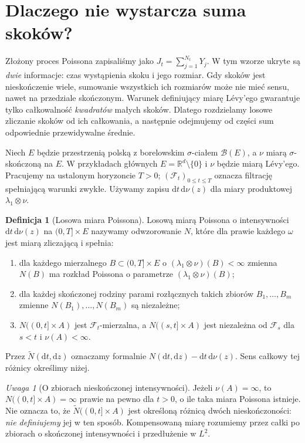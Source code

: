 \documentclass[11pt,a4paper,oneside]{report}
\numberwithin{equation}{chapter}
\theoremstyle{plain}
\theoremstyle{definition}
\newtheorem{definicja}{Definicja}[chapter]
\theoremstyle{remark}
\newtheorem{uwaga}{Uwaga}[chapter]
\newcommand{\R}{\mathbb{R}}
\newcommand{\calF}{\mathcal{F}}
\newcommand{\calB}{\mathcal{B}}
\newcommand{\dd}{\mathrm{d}}
\begin{document}
\section{Dlaczego nie wystarcza suma skoków?}

Złożony proces Poissona zapisaliśmy jako $J_t=\sum_{j=1}^{N_t}Y_j$.
W tym wzorze ukryte są \emph{dwie} informacje: czas wystąpienia
skoku i jego rozmiar. Gdy skoków jest nieskończenie wiele, sumowanie
wszystkich ich rozmiarów może nie mieć sensu, nawet na przedziale
skończonym. Warunek definiujący miarę Lévy'ego gwarantuje tylko
całkowalność \emph{kwadratów} małych skoków. Dlatego rozdzielamy
losowe zliczanie skoków od ich całkowania, a następnie odejmujemy
od części sum odpowiednie przewidywalne średnie.

Niech $E$ będzie przestrzenią polską z borelowskim $\sigma$-ciałem
$\calB(E)$, a $\nu$ miarą $\sigma$-skończoną na $E$.
W przykładach głównych $E=\R^d\setminus\{0\}$ i $\nu$ będzie
miarą Lévy'ego. Pracujemy na ustalonym horyzoncie $T>0$;
$(\calF_t)_{0\le t\le T}$ oznacza filtrację spełniającą warunki
zwykłe. Używamy zapisu $\dd t\,\dd\nu(z)$ dla miary
produktowej $\lambda_1\otimes\nu$.

\begin{definicja}[Losowa miara Poissona]
\label{def:PRM}
Losową miarą Poissona o intensywności $\dd t\,\dd\nu(z)$ na
$(0,T]\times E$ nazywamy odwzorowanie $N$, które dla prawie każdego
$\omega$ jest miarą zliczającą i spełnia:
\begin{enumerate}
\item dla każdego mierzalnego $B\subset(0,T]\times E$ o
$(\lambda_1\otimes\nu)(B)<\infty$ zmienna $N(B)$ ma rozkład
Poissona o parametrze $(\lambda_1\otimes\nu)(B)$;
\item dla każdej skończonej rodziny parami rozłącznych takich
zbiorów $B_1,\ldots,B_m$ zmienne $N(B_1),\ldots,N(B_m)$ są niezależne;
\item $N((0,t]\times A)$ jest $\calF_t$-mierzalna, a
$N((s,t]\times A)$ jest niezależna od $\calF_s$ dla $s<t$
i $\nu(A)<\infty$.
\end{enumerate}
Przez $\widetilde N(\dd t,\dd z)$ oznaczamy formalnie
$N(\dd t,\dd z)-\dd t\,\dd\nu(z)$. Sens całkowy tej różnicy
określimy niżej.
\end{definicja}

\begin{uwaga}[O zbiorach nieskończonej intensywności]
Jeżeli $\nu(A)=\infty$, to $N((0,t]\times A)=\infty$
prawie na pewno dla $t>0$, o ile taka miara Poissona istnieje.
Nie oznacza to, że $\widetilde N((0,t]\times A)$ jest określoną
różnicą dwóch nieskończoności: \emph{nie definiujemy} jej w ten
sposób. Kompensowaną miarę rozumiemy przez całki po zbiorach o
skończonej intensywności i przedłużenie w $L^2$.
\end{uwaga}
\end{document}
